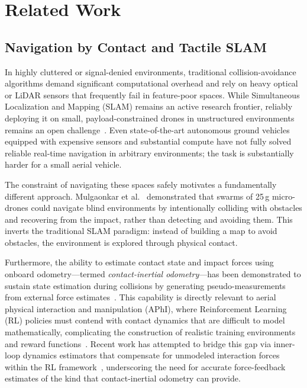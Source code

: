 \clearpage
\section{Related Work}

\subsection{Navigation by Contact and Tactile SLAM}

In highly cluttered or signal-denied environments, traditional collision-avoidance algorithms demand significant computational overhead and rely on heavy optical or LiDAR sensors that frequently fail in feature-poor spaces. While Simultaneous Localization and Mapping (SLAM) remains an active research frontier, reliably deploying it on small, payload-constrained drones in unstructured environments remains an open challenge~\cite{macariorojas2021}. Even state-of-the-art autonomous ground vehicles equipped with expensive sensors and substantial compute have not fully solved reliable real-time navigation in arbitrary environments; the task is substantially harder for a small aerial vehicle.

The constraint of navigating these spaces safely motivates a fundamentally different approach. Mulgaonkar et al.~\cite{mulgaonkarRobustAerialRobot2018} demonstrated that swarms of 25\,g micro-drones could navigate blind environments by intentionally colliding with obstacles and recovering from the impact, rather than detecting and avoiding them. This inverts the traditional SLAM paradigm: instead of building a map to avoid obstacles, the environment is explored through physical contact.

Furthermore, the ability to estimate contact state and impact forces using onboard odometry---termed \emph{contact-inertial odometry}---has been demonstrated to sustain state estimation during collisions by generating pseudo-measurements from external force estimates~\cite{de_petris_collision_2022}. This capability is directly relevant to aerial physical interaction and manipulation (APhI), where Reinforcement Learning (RL) policies must contend with contact dynamics that are difficult to model mathematically, complicating the construction of realistic training environments and reward functions~\cite{borgherini_oneshot_2025}. Recent work has attempted to bridge this gap via inner-loop dynamics estimators that compensate for unmodeled interaction forces within the RL framework~\cite{singh_reinforcement_2026}, underscoring the need for accurate force-feedback estimates of the kind that contact-inertial odometry can provide.

